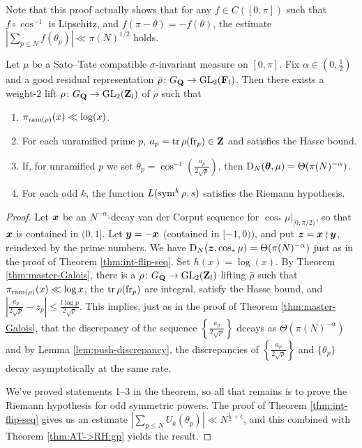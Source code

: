 Note that this proof actually shows that for any $f\in C([0,\pi])$ such 
that $f\circ \cos^{-1}$ is Lipschitz, and $f(\pi-\theta) = -f(\theta)$, the 
estimate $\left| \sum_{p\leqslant N} f(\theta_p)\right| \ll \pi(N)^{1/2}$ 
holds. 

\begin{theorem}\label{thm:bad-Galois}
Let $\mu$ be a Sato--Tate compatible $\sigma$-invariant measure on $[0,\pi]$. 
Fix $\alpha\in \left(0,\frac 1 2\right)$ and a good residual representation 
$\bar\rho\colon G_{\mathbf{Q}} \to \operatorname{GL}_2(\mathbf{F}_l)$. Then there exists a weight-$2$ lift 
$\rho\colon G_{\mathbf{Q}} \to \operatorname{GL}_2(\mathbf{Z}_l)$ of $\bar\rho$ such that 
\begin{enumerate}
\item
$\pi_{\mathrm{ram}(\rho)}(x) \ll \log(x)$. 

\item
For each unramified prime $p$, $a_p = \operatorname{tr}\rho(\mathrm{fr}_p)\in \mathbf{Z}$ and satisfies 
the Hasse bound. 

\item
If, for unramified $p$ we set 
$\theta_p = \cos^{-1}\left(\frac{a_p}{2\sqrt p}\right)$, then 
$\operatorname{D}_N({\boldsymbol\theta},\mu) = \Theta(\pi(N)^{-\alpha})$. 

\item
For each odd $k$, the function $L(\operatorname{sym}^k \rho,s)$ satisfies the Riemann 
hypothesis. 
\end{enumerate}
\end{theorem}
\begin{proof}
Let ${\boldsymbol x}$ be an $N^{-\alpha}$-decay van der Corput sequence for 
$\cos_\ast \left.\mu\right|_{[0,\pi/2)}$, so that ${\boldsymbol x}$ is contained in 
$(0,1]$. Let ${\boldsymbol y} = -{\boldsymbol x}$ (contained in $[-1,0)$), and put 
${\boldsymbol z} = {\boldsymbol x}\wr{\boldsymbol y}$, reindexed by the prime numbers. We have
$\operatorname{D}_N({\boldsymbol z},\cos_\ast\mu) = \Theta(\pi(N)^{-\alpha})$ just as in the proof 
of Theorem \ref{thm:int-flip-seq}. Set $h(x) = \log(x)$. By Theorem 
\ref{thm:master-Galois}, there is a $\rho\colon G_{\mathbf{Q}} \to \operatorname{GL}_2(\mathbf{Z}_l)$ lifting 
$\bar\rho$ such that $\pi_{\mathrm{ram}(\rho)}(x) \ll \log x$, the $\operatorname{tr} \rho(\mathrm{fr}_p)$ 
are integral, satisfy the Hasse bound, and 
$\left| \frac{a_p}{2\sqrt p} - z_p\right| \leqslant \frac{l \log p}{2\sqrt p}$. 
This implies, just as in the proof of Theorem \ref{thm:master-Galois}, that 
the discrepancy of the sequence $\left\{\frac{a_p}{2\sqrt p}\right\}$ decays 
as $\Theta(\pi(N)^{-\alpha})$ and by Lemma \ref{lem:push-discrepancy}, the 
discrepancies of $\left\{\frac{a_p}{2\sqrt p}\right\}$ and $\{\theta_p\}$ 
decay asymptotically at the same rate. 

We've proved statements 1--3 in the theorem, so all that remains is to prove 
the Riemann hypothesis for odd symmetric powers. The proof of Theorem 
\ref{thm:int-flip-seq} gives us an estimate 
$\left| \sum_{p\leqslant N} U_k(\theta_p)\right| \ll N^{\frac 1 2+\epsilon}$, 
and this combined with Theorem \ref{thm:AT->RH:gp} yields the result. 
\end{proof}

